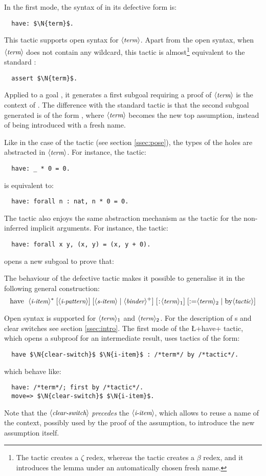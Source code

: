 In the first mode, the syntax of  in its defective form is:
\begin{lstlisting}
  have: $\N{term}$.
\end{lstlisting}
This tactic supports open syntax for $\langle\mbox{\itshape\rmfamily\small term}\rangle$. Apart from the open
syntax, when $\langle\mbox{\itshape\rmfamily\small term}\rangle$ does
not contain any wildcard, this tactic
is almost\footnote{The  tactic creates a $\zeta$ redex,
  whereas the  tactic creates a $\beta$ redex, and it
  introduces the lemma under an automatically chosen fresh name.}
equivalent to the standard \Coq{}:
\begin{lstlisting}
  assert $\N{term}$.
\end{lstlisting}
Applied to a goal , it generates a first subgoal requiring a
proof of $\langle\mbox{\itshape\rmfamily\small term}\rangle$ is the context of . The difference with
the standard \Coq{} tactic is that the second subgoal generated is of
the form , where $\langle\mbox{\itshape\rmfamily\small term}\rangle$ becomes the new top
assumption, instead of being introduced with a fresh name.

Like in the case of the  tactic (see section \ref{ssec:pose}),
the types of the holes are abstracted in $\langle\mbox{\itshape\rmfamily\small term}\rangle$.
For instance, the tactic:
\begin{lstlisting}
  have: _ * 0 = 0.
\end{lstlisting}
is equivalent to:
\begin{lstlisting}
  have: forall n : nat, n * 0 = 0.
\end{lstlisting}
The  tactic also enjoys the same abstraction mechanism as the
 tactic for the non-inferred implicit arguments. For instance,
the tactic:
\begin{lstlisting}
  have: forall x y, (x, y) = (x, y + 0).
\end{lstlisting}
opens a new subgoal to prove that:

\noindent{}


The behaviour of the defective  tactic makes it possible to
generalise it in the
following general construction:
  $$\C{have }\ \;\N{i-item}^* \; [\N{i-pattern}] \; 
     [\N{s-item}\;|\;\N{binder}^+]\;[\C{:} \N{term}_1]\;
     [\C{:=} \N{term}_2 \;|\; \C{by }\N{tactic}]$$ 

Open syntax is supported for $\langle\mbox{\itshape\rmfamily\small term}\rangle_1$ and $\langle\mbox{\itshape\rmfamily\small term}\rangle_2$. For the
description of
\iitem{}s and clear switches see section \ref{ssec:intro}.
The first mode of the \L+have+ tactic, which opens a subproof for an
intermediate result, uses tactics of the form:
\begin{lstlisting}
  have $\N{clear-switch}$ $\N{i-item}$ : /*term*/ by /*tactic*/.
\end{lstlisting}
which behave like:
\begin{lstlisting}
  have: /*term*/; first by /*tactic*/.
  move=> $\N{clear-switch}$ $\N{i-item}$.
\end{lstlisting}
Note that the $\langle\mbox{\itshape\rmfamily\small clear-switch}\rangle$ \emph{precedes} the
$\langle\mbox{\itshape\rmfamily\small i-item}\rangle$, which allows to reuse a name of the context, possibly used
by the proof of the assumption, to introduce the new assumption
itself. 

